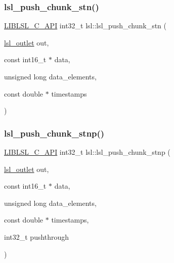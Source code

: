 \subsubsection{\texorpdfstring{lsl\+\_\+push\+\_\+chunk\+\_\+stn()}{lsl\_push\_chunk\_stn()}}
{\footnotesize\ttfamily \hyperlink{lsl__cpp_8h_aafd0ef1813e8be84a1420c4f1df64615}{L\+I\+B\+L\+S\+L\+\_\+\+C\+\_\+\+A\+PI} int32\+\_\+t lsl\+::lsl\+\_\+push\+\_\+chunk\+\_\+stn (\begin{DoxyParamCaption}\item[{\hyperlink{namespacelsl_abcf512b0f66dacf86c10b165995fd50b}{lsl\+\_\+outlet}}]{out,  }\item[{const int16\+\_\+t $\ast$}]{data,  }\item[{unsigned long}]{data\+\_\+elements,  }\item[{const double $\ast$}]{timestamps }\end{DoxyParamCaption})}

\mbox{\label{namespacelsl_aee4448b6c1239e14f9212700c828ca5b}} 
\subsubsection{\texorpdfstring{lsl\+\_\+push\+\_\+chunk\+\_\+stnp()}{lsl\_push\_chunk\_stnp()}}
{\footnotesize\ttfamily \hyperlink{lsl__cpp_8h_aafd0ef1813e8be84a1420c4f1df64615}{L\+I\+B\+L\+S\+L\+\_\+\+C\+\_\+\+A\+PI} int32\+\_\+t lsl\+::lsl\+\_\+push\+\_\+chunk\+\_\+stnp (\begin{DoxyParamCaption}\item[{\hyperlink{namespacelsl_abcf512b0f66dacf86c10b165995fd50b}{lsl\+\_\+outlet}}]{out,  }\item[{const int16\+\_\+t $\ast$}]{data,  }\item[{unsigned long}]{data\+\_\+elements,  }\item[{const double $\ast$}]{timestamps,  }\item[{int32\+\_\+t}]{pushthrough }\end{DoxyParamCaption})}

\mbox{\label{namespacelsl_a8de67854b1d0c9de42e3e69997f68d0c}} 
